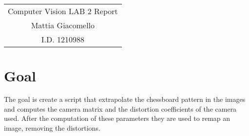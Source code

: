 \documentclass[11pt,a4paper]{article}
\begin{document}
\begin{center}
\begin{tabular}{c}
\LARGE{Computer Vision LAB 2 Report}\\
\large{Mattia Giacomello}\\
I.D. 1210988
\end{tabular}
\end{center}

\section{Goal}
The goal is create a script that extrapolate the chessboard pattern in the images and computes the camera matrix and the distortion coefficients of the camera used.
After the computation of these parameters they are used to remap an image, removing the distortions.
\end{document}
